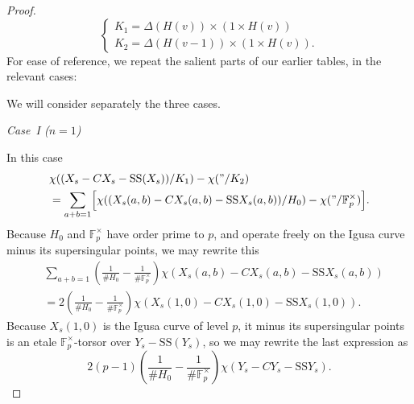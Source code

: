 \begin{proof}
\begin{equation}
\begin{cases}
K_1 = \Delta(H(v)) \times (1 \times H(v)) \\[4pt]
K_2 = \Delta(H(v-1)) \times (1 \times H(v)) .
\end{cases}
\end{equation}
For ease of reference, we repeat the salient parts of our earlier tables, in the relevant cases:
\begin{center}
\end{center}
We will consider separately the three cases.

\kmitem\label{item:14.5.11} \emph{Case~I ($n = 1$)}

In this case
\begin{align*}
&\chi((X_s - CX_s - \mathrm{SS}(X_s))/K_1) - \chi(\text{''}/K_2) \\
&= \sum_{a+b=1} \Bigl[ \chi((X_s(a,b) - CX_s(a,b) - \mathrm{SS} X_s(a,b))/H_0) - \chi(\text{''}/\mathbb{F}_p^\times) \Bigr] .
\end{align*}
Because $H_0$ and $\mathbb{F}_p^\times$ have order prime to $p$, and operate freely on the Igusa curve minus its supersingular points, we may rewrite this
\begin{align*}
&\sum_{a+b=1} \left( \frac{1}{\# H_0} - \frac{1}{\#\mathbb{F}_p^\times} \right) \chi(X_s(a,b) - CX_s(a,b) - \mathrm{SS} X_s(a,b)) \\
&= 2 \left( \frac{1}{\# H_0} - \frac{1}{\#\mathbb{F}_p^\times} \right) \chi(X_s(1,0) - CX_s(1,0) - \mathrm{SS} X_s(1,0)) .
\end{align*}
Because $X_s(1,0)$ is the Igusa curve of level $p$, it minus its supersingular points is an etale $\mathbb{F}_p^\times$-torsor over $Y_s - \mathrm{SS}(Y_s)$, so we may rewrite the last expression as
\[
2(p-1) \left( \frac{1}{\# H_0} - \frac{1}{\#\mathbb{F}_p^\times} \right) \chi(Y_s - CY_s - \mathrm{SS} Y_s) .
\]


\end{proof}
